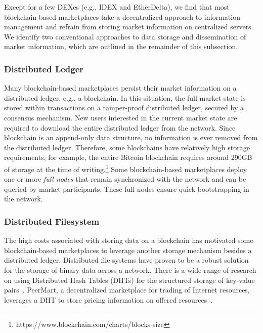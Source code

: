 Except for a few DEXes (e.g., IDEX and EtherDelta), we find that most blockchain-based marketplaces take a decentralized approach to information management and refrain from storing market information on centralized servers.
We identify two conventional approaches to data storage and dissemination of market information, which are outlined in the remainder of this subsection.

\subsubsection{Distributed Ledger}
Many blockchain-based marketplaces persist their market information on a distributed ledger, e.g., a blockchain.
In this situation, the full market state is stored within transactions on a tamper-proof distributed ledger, secured by a consensus mechanism.
New users interested in the current market state are required to download the entire distributed ledger from the network.
Since blockchain is an append-only data structure, no information is ever removed from the distributed ledger.
Therefore, some blockchains have relatively high storage requirements, for example, the entire Bitcoin blockchain requires around 290GB of storage at the time of writing.\footnote{https://www.blockchain.com/charts/blocks-size}
Some blockchain-based marketplaces deploy one or more \emph{full nodes} that remain synchronized with the network and can be queried by market participants.
These full nodes ensure quick bootstrapping in the network.

\subsubsection{Distributed Filesystem}
The high costs associated with storing data on a blockchain has motivated some blockchain-based marketplaces to leverage another storage mechanism besides a distributed ledger.
Distributed file systems have proven to be a robust solution for the storage of binary data across a network.
There is a wide range of research on using Distributed Hash Tables (DHTs) for the structured storage of key-value pairs~\cite{maymounkov2002kademlia}.
PeerMart, a decentralized marketplace for trading of Internet resources, leverages a DHT to store pricing information on offered resources~\cite{hausheer2006peermart}.

